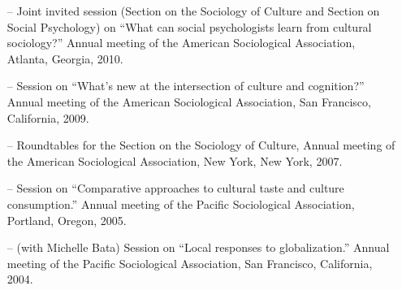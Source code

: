 \begin{itemize}[itemsep=-0.5ex]
    \item[--] Joint invited session (Section on the Sociology of Culture and Section on Social Psychology) on ``What can social psychologists learn from cultural sociology?''   Annual meeting of the American Sociological Association, Atlanta, Georgia, 2010.
    
    \item[--] Session on ``What's new at the intersection of culture and cognition?'' Annual meeting of the American Sociological Association, San Francisco, California, 2009.
    
    \item[--] Roundtables for the Section on the Sociology of Culture, Annual meeting of the American Sociological Association, New York, New York, 2007.
    
    \item[--] Session on ``Comparative approaches to cultural taste and culture consumption.'' Annual meeting of the Pacific Sociological Association, Portland, Oregon, 2005.
    
    \item[--] (with Michelle Bata) Session on ``Local responses to globalization.'' Annual meeting of the Pacific Sociological Association, San Francisco, California, 2004.
\end{itemize}